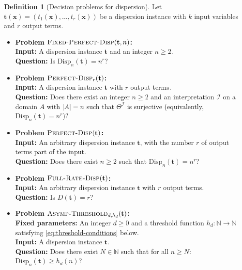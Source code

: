 \documentclass[11pt]{article}
\theoremstyle{definition}
\newtheorem{definition}{Definition}[section]
\theoremstyle{plain}
\newcommand{\Disp}{\mathrm{Disp}}
\begin{document}
\begin{definition}[Decision problems for dispersion]
\label{def:decision-problems}
Let $\mathbf t(\mathbf x) = (t_1(\mathbf x),\dots,t_r(\mathbf x))$ be a dispersion instance with $k$ input variables and $r$ output terms.

\begin{itemize}[leftmargin=*]
\item \textbf{Problem $\textsc{Fixed-Perfect-Disp}(\mathbf t, n)$:}\\
\textbf{Input:} A dispersion instance $\mathbf t$ and an integer $n \ge 2$.\\
\textbf{Question:} Is $\Disp_n(\mathbf t) = n^r$?

\item \textbf{Problem $\textsc{Perfect-Disp}_r(\mathbf t)$:}\\
\textbf{Input:} A dispersion instance $\mathbf t$ with $r$ output terms.\\
\textbf{Question:} Does there exist an integer $n \ge 2$ and an interpretation $\mathcal I$ on a domain $A$ with $|A| = n$ such that $\Theta^{\mathcal I}$ is surjective (equivalently, $\Disp_n(\mathbf t) = n^r$)?

\item \textbf{Problem $\textsc{Perfect-Disp}(\mathbf t)$:}\\
\textbf{Input:} An arbitrary dispersion instance $\mathbf t$, with the number $r$ of output terms part of the input.\\
\textbf{Question:} Does there exist $n\ge 2$ such that $\Disp_n(\mathbf t)=n^r$?

\item \textbf{Problem $\textsc{Full-Rate-Disp}(\mathbf t)$:}\\
\textbf{Input:} An arbitrary dispersion instance $\mathbf t$ with $r$ output terms.\\
\textbf{Question:} Is $D(\mathbf t)=r$?

\item \textbf{Problem $\textsc{Asymp-Threshold}_{d,h_d}(\mathbf t)$:}\\
\textbf{Fixed parameters:} An integer $d\ge 0$ and a threshold function
$h_d:\mathbb N\to\mathbb N$ satisfying \eqref{eq:threshold-conditions} below.\\
\textbf{Input:} A dispersion instance $\mathbf t$.\\
\textbf{Question:} Does there exist $N \in \mathbb{N}$ such that for all $n \ge N$:
$\Disp_n(\mathbf t) \ge h_d(n)$?
\end{itemize}
\end{definition}
\end{document}
